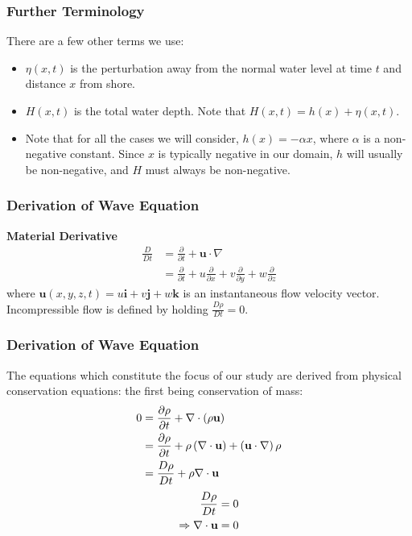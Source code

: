 \documentclass[xcolor=dvipsnames]{beamer}
\begin{document}
\begin{frame}
\frametitle{Further Terminology}
There are a few other terms we use:
\begin{itemize}
\item $\eta(x,t)$ is the perturbation away from the normal water level at time $t$ and distance $x$ from shore.
\item $H(x,t)$ is the total water depth. Note that $H(x,t) = h(x) + \eta(x,t)$.
\item Note that for all the cases we will consider, $h(x) = -\alpha x$, where $\alpha$ is a non-negative constant. Since $x$ is typically negative in our domain, $h$ will usually be non-negative, and $H$ must always be non-negative.
\end{itemize}
\end{frame}

\begin{frame}
\frametitle{Derivation of Wave Equation}
\textbf{Material Derivative}
\begin{align*}
\frac{D}{Dt} &= \frac{\partial}{\partial t} + \textbf{u}\cdot\nabla\\
&= \frac{\partial}{\partial t} + u\frac{\partial}{\partial x} + v\frac{\partial}{\partial y} + w\frac{\partial}{\partial z}
\end{align*}
where $ \textbf{u}(x,y,z,t) = u\textbf{i}+v\textbf{j}+w\textbf{k} $ is an instantaneous flow velocity vector.\\
Incompressible flow is defined by holding $\frac{D \rho}{D t} = 0$.
\end{frame}

\begin{frame}
\frametitle{Derivation of Wave Equation}
The equations which constitute the focus of our study are derived from physical conservation equations: the first being conservation of mass:
\begin{align}
0 &= \frac{ \partial \rho }{\partial t} + \nabla \cdot ( \rho \textbf{u} )\\
&= \frac{\partial \rho}{\partial t} + \rho \left( \nabla \cdot \textbf{u} \right) + \left( \textbf{u} \cdot \nabla \right) \rho \notag \\
&= \frac{D \rho}{D t} + \rho \nabla \cdot \textbf{u} \notag
\end{align}
\begin{align}
\frac{D \rho}{D t} &=0 \notag \\
\Rightarrow  \nabla \cdot \textbf{u}& = 0 \label{delu}
\end{align}
\end{frame}
\end{document}
